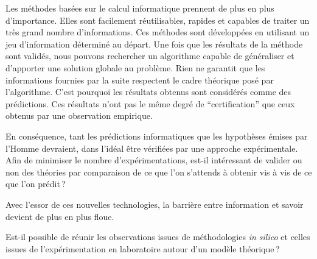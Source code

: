 \begin{refsegment}

Les méthodes basées sur le calcul informatique prennent de plus en plus d'importance. Elles sont facilement réutilisables, rapides et capables de traiter un très grand nombre d'informations. Ces méthodes sont développées en utilisant un jeu d'information déterminé au départ. Une fois que les résultats de la méthode sont validés, nous pouvons rechercher un algorithme capable de généraliser et d'apporter une solution globale au problème. Rien ne garantit que les informations fournies par la suite respectent le cadre théorique posé par l'algorithme. C'est pourquoi les résultats obtenus sont considérés comme des prédictions. Ces résultats n'ont pas le même degré de “certification” que ceux obtenus par une observation empirique.

En conséquence, tant les prédictions informatiques que les hypothèses émises par l'Homme devraient, dans l'idéal être vérifiées par une approche expérimentale. Afin de minimiser le nombre d'expérimentations, est-il intéressant de valider ou non des théories par comparaison de ce que l'on s'attends à obtenir vis à vis de ce que l'on prédit ?

Avec l'essor de ces nouvelles technologies, la barrière entre information et savoir devient de plus en plus floue.



Est-il possible de réunir les observations issues de méthodologies \textit{in silico} et celles issues de l'expérimentation en laboratoire autour d'un modèle théorique ?


\end{refsegment}
